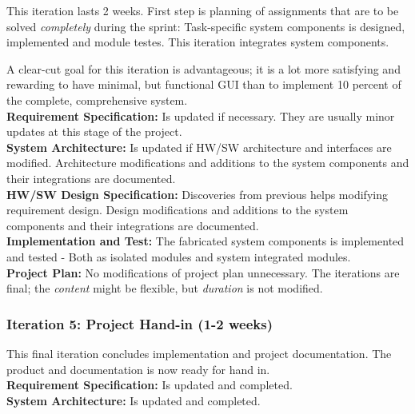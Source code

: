 This iteration lasts 2 weeks. First step is planning of assignments that are to be solved \textit{completely} during the sprint: Task-specific system components is designed, implemented and module testes. This iteration integrates system components. \newline

A clear-cut goal for this iteration is advantageous; it is a lot more satisfying and rewarding to have minimal, but functional GUI than to implement 10 percent of the complete, comprehensive system. \\

\textbf{Requirement Specification:} Is updated if necessary. They are usually minor updates at this stage of the project. \\

\textbf{System Architecture:} Is updated if HW/SW architecture and interfaces are modified. Architecture modifications and additions to the system components and their integrations are documented. \\

\textbf{HW/SW Design Specification:} Discoveries from previous helps modifying requirement design. Design modifications and additions to the system components and their integrations are documented. \\

\textbf{Implementation and Test:} The fabricated system components is implemented and tested - Both as isolated modules and system integrated modules. \\

\textbf{Project Plan:} No modifications of project plan unnecessary. The iterations are final; the \textit{content} might be flexible, but \textit{duration} is not modified. \newline

\subsubsection{Iteration 5: Project Hand-in (1-2 weeks)}
This final iteration concludes implementation and project documentation. The product and documentation is now ready for hand in. \\

\textbf{Requirement Specification:} Is updated and completed. \\

\textbf{System Architecture:} Is updated and completed. \\

